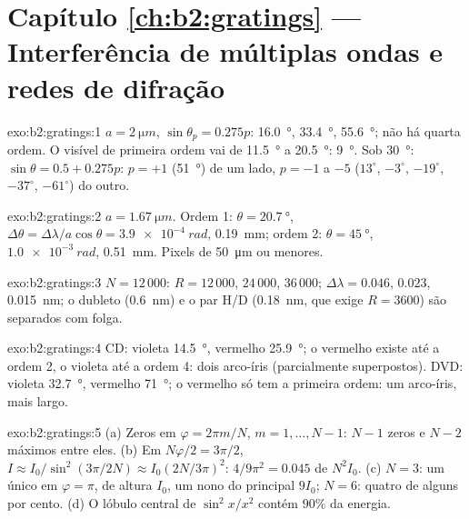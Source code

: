 \section*{Capítulo \ref{ch:b2:gratings} --- Interferência de múltiplas ondas e redes de difração}

\begin{solution}{exo:b2:gratings:1}
$a = \qty{2}{\micro m}$, $\sin\theta_p = 0.275p$: \qty{16.0}{\degree}, \qty{33.4}{\degree}, \qty{55.6}{\degree};
não há quarta ordem. O visível de primeira ordem vai de \qty{11.5}{\degree} a \qty{20.5}{\degree}:
\qty{9}{\degree}. Sob \qty{30}{\degree}: $\sin\theta = 0.5 + 0.275p$: $p = +1$ (\qty{51}{\degree}) de um
lado, $p = -1$ a $-5$ ($13^\circ$, $-3^\circ$, $-19^\circ$, $-37^\circ$, $-61^\circ$) do
outro.
\end{solution}

\begin{solution}{exo:b2:gratings:2}
$a = \qty{1.67}{\micro m}$. Ordem 1: $\theta = \qty{20.7}{\degree}$, $\Delta\theta = \Delta\lambda/a\cos\theta =
\qty{3.9e-4}{rad}$, \qty{0.19}{mm}; ordem 2: $\theta = \qty{45}{\degree}$, $\qty{1.0e-3}{rad}$,
\qty{0.51}{mm}. Pixels de \qty{50}{\micro m} ou menores.
\end{solution}

\begin{solution}{exo:b2:gratings:3}
$N = 12\,000$: $R = 12\,000$, $24\,000$, $36\,000$; $\Delta\lambda = 0.046$, $0.023$, \qty{0.015}{nm};
o dubleto (\qty{0.6}{nm}) e o par H/D (\qty{0.18}{nm}, que exige $R = 3600$)
são separados com folga.
\end{solution}

\begin{solution}{exo:b2:gratings:4}
CD: violeta \qty{14.5}{\degree}, vermelho \qty{25.9}{\degree}; o vermelho existe até a ordem 2, o violeta até a
ordem 4: dois arco-íris (parcialmente superpostos). DVD: violeta \qty{32.7}{\degree}, vermelho
\qty{71}{\degree}; o vermelho só tem a primeira ordem: um arco-íris, mais largo.
\end{solution}

\begin{solution}{exo:b2:gratings:5}
(a) Zeros em $\varphi = 2\pi m/N$, $m = 1, \dots, N - 1$: $N - 1$ zeros e $N - 2$ máximos
entre eles. (b) Em $N\varphi/2 = 3\pi/2$, $I \approx I_0/\sin^2(3\pi/2N) \approx I_0(2N/3\pi)^2$:
$4/9\pi^2 = 0.045$ de $N^2I_0$. (c) $N = 3$: um único  em
$\varphi = \pi$, de altura $I_0$, um nono do principal $9I_0$; $N = 6$: quatro
 de alguns por cento. (d) O lóbulo central de $\sin^2x/x^2$
contém $90\%$ da energia.
\end{solution}

